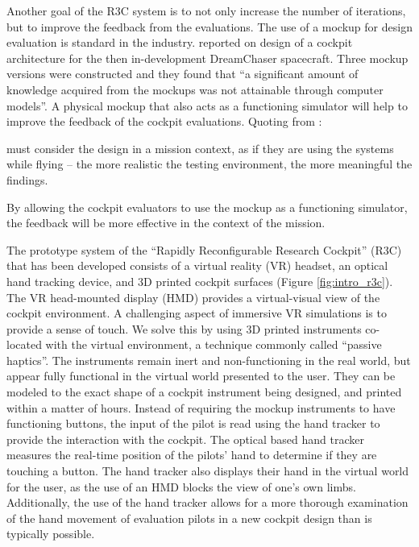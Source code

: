 Another goal of the R3C system is to not only increase the number of iterations, but to improve the feedback from the evaluations.
The use of a mockup for design evaluation is standard in the industry.
\citet{zea_development_2012} reported on design of a cockpit architecture for the then in-development DreamChaser spacecraft.
Three mockup versions were constructed and they found that ``a significant amount of knowledge acquired from the mockups was not attainable through computer models''.
A physical mockup that also acts as a functioning simulator will help to improve the feedback of the cockpit evaluations.
Quoting from \citet{sexton_cockpitcrew_1988}:
\begin{displayquote}
 must consider the design in a mission context, as if they are using the systems while flying -- the more realistic the testing environment, the more meaningful the findings.
\end{displayquote}
By allowing the cockpit evaluators to use the mockup as a functioning simulator, the feedback will be more effective in the context of the mission.

The prototype system of the ``Rapidly Reconfigurable Research Cockpit'' (R3C) that has been developed consists of a virtual reality (VR) headset, an optical hand tracking device, and 3D printed cockpit surfaces (Figure \ref{fig:intro_r3c}).
The VR head-mounted display (HMD) provides a virtual-visual view of the cockpit environment.
A challenging aspect of immersive VR simulations is to provide a sense of touch.
We solve this by using 3D printed instruments co-located with the virtual environment, a technique commonly called ``passive haptics''.
The instruments remain inert and non-functioning in the real world, but appear fully functional in the virtual world presented to the user.
They can be modeled to the exact shape of a cockpit instrument being designed, and printed within a matter of hours.
Instead of requiring the mockup instruments to have functioning buttons, the input of the pilot is read using the hand tracker to provide the interaction with the cockpit.
The optical based hand tracker measures the real-time position of the pilots' hand to determine if they are touching a button.
The hand tracker also displays their hand in the virtual world for the user, as the use of an HMD blocks the view of one's own limbs.
Additionally, the use of the hand tracker allows for a more thorough examination of the hand movement of evaluation pilots in a new cockpit design than is typically possible.

